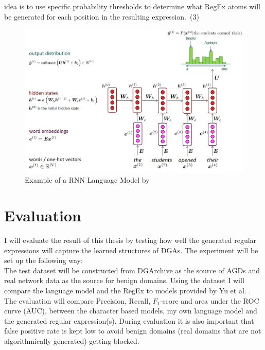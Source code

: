 \documentclass[a4paper, 12pt]{article}
\begin{document}
idea is to use specific probability thresholds to determine what RegEx atoms will be generated for
each position in the resulting expression.~(3)
\begin{figure}[h]
    \includegraphics[width=\textwidth]{cs224n-spr2024-lecture05-language-model.png}
    \caption{Example of a RNN Language Model by \cite{manning_natural_2024}}
    \label{fig:RNNLanguageModel}
\end{figure}
\section{Evaluation}
I will evaluate the result of this thesis by testing how well the generated regular expressions
will capture the learned structures of DGAs.  
The experiment will be set up the following way:\\
The test dataset will be constructed from DGArchive\cite{dgarchive_2024} as the source of AGDs and
real network data as the source for benign domains.
Using the dataset I will compare the language model and the RegEx to models provided by Yu et al. 
\cite{yu_character_2018}. The evaluation will compare Precision, Recall,
$F_1$-score and area under the ROC curve (AUC), between the character based models, my own language
model and the generated regular expression(s).
During evaluation it is also important that false positive rate is kept low to avoid benign domains
(real domains that are not algorithmically generated) getting blocked.
\end{document}
